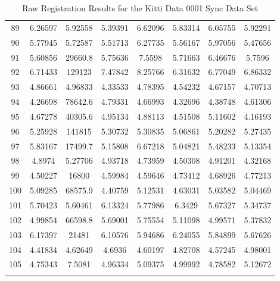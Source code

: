 \begin{center}
\begin{longtable}{cccccccc}
89 & 6.26597 & 5.92558 & 5.39391 & 6.62096 & 5.83314 & 6.05755 & 5.92291\\
90 & 5.77945 & 5.72587 & 5.51713 & 6.27735 & 5.56167 & 5.97056 & 5.47656\\
91 & 5.60856 & 29660.8 & 5.75636 & 7.5598 & 5.71663 & 6.46676 & 5.7596\\
92 & 6.71433 & 129123 & 7.47842 & 8.25766 & 6.31632 & 6.77049 & 6.86332\\
93 & 4.86661 & 4.96833 & 4.33533 & 4.78395 & 4.54232 & 4.67157 & 4.70713\\
94 & 4.26698 & 78642.6 & 4.79331 & 4.66993 & 4.32696 & 4.38748 & 4.61306\\
95 & 4.67278 & 40305.6 & 4.95134 & 4.88113 & 4.51508 & 5.11602 & 4.16193\\
96 & 5.25928 & 141815 & 5.30732 & 5.30835 & 5.06861 & 5.20282 & 5.27435\\
97 & 5.83167 & 17499.7 & 5.15808 & 6.67218 & 5.04821 & 5.48233 & 5.13354\\
98 & 4.8974 & 5.27706 & 4.93718 & 4.73959 & 4.50308 & 4.91201 & 4.32168\\
99 & 4.50227 & 16800 & 4.59984 & 4.59646 & 4.73412 & 4.68926 & 4.77213\\
100 & 5.09285 & 68575.9 & 4.40759 & 5.12531 & 4.63031 & 5.03582 & 5.04469\\
101 & 5.70423 & 5.60461 & 6.13324 & 5.77986 & 6.3429 & 5.67327 & 5.34737\\
102 & 4.99854 & 66598.8 & 5.69001 & 5.75554 & 5.11098 & 4.99571 & 5.37832\\
103 & 6.17397 & 21481 & 6.10576 & 5.94686 & 6.24055 & 5.84899 & 5.67626\\
104 & 4.41834 & 4.62649 & 4.6936 & 4.60197 & 4.82708 & 4.57245 & 4.98001\\
105 & 4.75343 & 7.5081 & 4.96334 & 5.09375 & 4.99992 & 4.78582 & 5.12672\\
\caption{Raw Registration Results for the Kitti Data 0001 Sync Data Set}
\label{tab:kittidata0001syncFULL}
\end{longtable}
\end{center}


